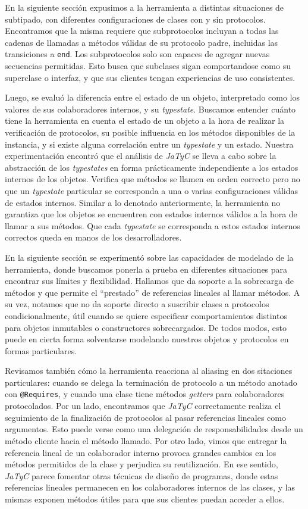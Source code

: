 En la siguiente sección expusimos a la herramienta a distintas situaciones de subtipado, con diferentes configuraciones de clases con y sin protocolos. Encontramos que la misma requiere que subprotocolos incluyan a todas las cadenas de llamadas a métodos válidas de su protocolo padre, incluidas las transiciones a \texttt{end}. Los subprotocolos solo son capaces de agregar nuevas secuencias permitidas. Esto busca que subclases sigan comportandose como su superclase o interfaz, y que sus clientes tengan experiencias de uso consistentes.

Luego, se evaluó la diferencia entre el estado de un objeto, interpretado como los valores de sus colaboradores internos, y su \textit{typestate}. Buscamos entender cuánto tiene la herramienta en cuenta el estado de un objeto a la hora de realizar la verificación de protocolos, su posible influencia en los métodos disponibles de la instancia, y si existe alguna correlación entre un \textit{typestate} y un estado. Nuestra experimentación encontró que el análisis de \textit{JaTyC} se lleva a cabo sobre la abstracción de los \textit{typestates} en forma prácticamente independiente a los estados internos de los objetos. Verifica que métodos se llamen en orden correcto pero no que un \textit{typestate} particular se corresponda a una o varias configuraciones válidas de estados internos. Similar a lo denotado anteriormente, la herramienta no garantiza que los objetos se encuentren con estados internos válidos a la hora de llamar a sus métodos. Que cada \textit{typestate} se corresponda a estos estados internos correctos queda en manos de los desarrolladores.

En la siguiente sección se experimentó sobre las capacidades de modelado de la herramienta, donde buscamos ponerla a prueba en diferentes situaciones para encontrar sus límites y flexibilidad. Hallamos que da soporte a la sobrecarga de métodos y que permite el ``prestado'' de referencias lineales al llamar métodos. A su vez, notamos que no da soporte directo a suscribir clases a protocolos condicionalmente, útil cuando se quiere especificar comportamientos distintos para objetos inmutables o constructores sobrecargados. De todos modos, esto puede en cierta forma solventarse modelando nuestros objetos y protocolos en formas particulares.

Revisamos también cómo la herramienta reacciona al aliasing en dos sitaciones particulares: cuando se delega la terminación de protocolo a un método anotado con \texttt{@Requires}, y cuando una clase tiene métodos \textit{getters} para colaboradores protocolados. Por un lado, encontramos que \textit{JaTyC} correctamente realiza el seguimiento de la finalización de protocolos al pasar referencias lineales como argumentos. Esto puede verse como una delegación de responsabilidades desde un método cliente hacia el método llamado. Por otro lado, vimos que entregar la referencia lineal de un colaborador interno provoca grandes cambios en los métodos permitidos de la clase y perjudica su reutilización. En ese sentido, \textit{JaTyC} parece fomentar otras técnicas de diseño de programas, donde estas referencias lineales permanecen en los colaboradores internos de las clases, y las mismas exponen métodos útiles para que sus clientes puedan acceder a ellos.

